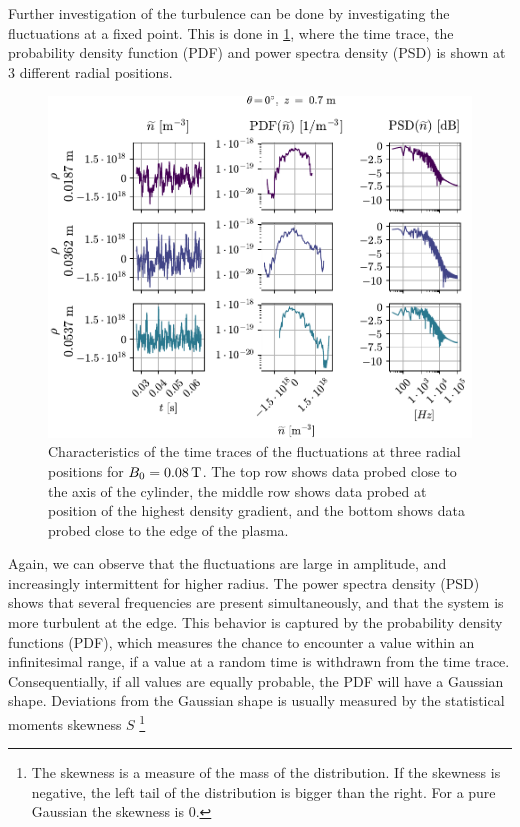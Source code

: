 Further investigation of the turbulence can be done by investigating the fluctuations at a fixed point.
This is done in \cref{fig:combinedPlots008}, where the time trace, the probability density function (PDF) and power spectra density (PSD) is shown at $3$ different radial positions.
%
\begin{figure}[htb]
    \centering
    \includegraphics{fig/results/combinedPlots/008T}
    \caption{Characteristics of the time traces of the fluctuations at three radial positions for $B_0=0.08\, \text{T}$.
        The top row shows data probed close to the axis of the cylinder,
        the middle row shows data probed at position of the highest density gradient,
        and the bottom shows data probed close to the edge of the plasma.
    }
    \label{fig:combinedPlots008}
\end{figure}
%
Again, we can observe that the fluctuations are large in amplitude, and increasingly intermittent for higher radius.
The power spectra density (PSD) shows that several frequencies are present simultaneously, and that the system is more turbulent at the edge.
This behavior is captured by the probability density functions (PDF), which measures the chance to encounter a value within an infinitesimal range, if a value at a random time is withdrawn from the time trace.
Consequentially, if all values are equally probable, the PDF will have a Gaussian shape.
Deviations from the Gaussian shape is usually measured by the statistical moments skewness $S$%
%
\footnote{
    The skewness is a measure of the mass of the distribution.
    If the skewness is negative, the left tail of the distribution is bigger than the right.
    For a pure Gaussian the skewness is 0.
}

